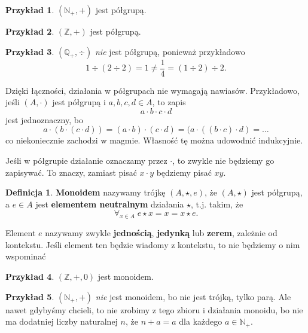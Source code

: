 \documentclass{article}
\theoremstyle{definition}
\newtheorem{definition}{Definicja}[section]
\newtheorem{example}{Przykład}[section]
\begin{document}
\begin{example}
	$(\mathbb{N}_+, +)$ jest półgrupą.
\end{example}

\begin{example}
	$(\mathbb{Z}, +)$ jest półgrupą.
\end{example}

\begin{example}
	$(\mathbb{Q}_+, \div)$ \textit{nie} jest półgrupą, ponieważ przykładowo
	\begin{equation*}
		1 \div (2 \div 2) = 1 \neq \frac{1}{4} = (1\div2)\div2.
	\end{equation*}
\end{example}

Dzięki łączności,
	działania w półgrupach nie wymagają nawiasów.
Przykładowo, jeśli $(A, \cdot)$ jest półgrupą i $a, b, c, d \in A$,
	to zapis
\begin{equation}
	a \cdot b \cdot c \cdot d
\end{equation}
	jest jednoznaczny, bo
\begin{equation}
		a \cdot (b \cdot (c \cdot d)) = 
		(a \cdot b) \cdot (c \cdot d) =
		(a \cdot ((b \cdot c) \cdot d) = \dots
\end{equation}
	co niekoniecznie zachodzi w magmie.
Własność tę można udowodnić indukcyjnie.

Jeśli w półgrupie działanie oznaczamy przez $\cdot$,
	to zwykle nie będziemy go zapisywać.
To znaczy, zamiast pisać $x \cdot y$ będziemy pisać $xy$.

\begin{definition}
	\textbf{Monoidem} nazywamy trójkę $(A, \star, e)$,
		że $(A, \star)$ jest półgrupą,
		a $e\in A$ jest \textbf{elementem neutralnym} działania $\star$,
		t.j. takim, że
	\begin{equation}
		\forall_{x \in A}\; e \star x = x = x \star e.
	\end{equation}
\end{definition}

Element $e$ nazywamy zwykle \textbf{jednością},
	\textbf{jedynką} lub \textbf{zerem},
	zależnie od kontekstu.
Jeśli element ten będzie wiadomy z kontekstu,
	to nie będziemy o nim wspominać

\begin{example}
	$(\mathbb{Z}, +, 0)$ jest monoidem.
\end{example}

\begin{example}
	$(\mathbb{N}_+, +)$ \textit{nie} jest monoidem, bo nie jest trójką, tylko parą.
	Ale nawet gdybyśmy chcieli,
		to nie zrobimy z tego zbioru i działania monoidu,
		bo nie ma dodatniej liczby naturalnej $n$,
		że $n + a = a$ dla każdego $a \in \mathbb{N}_+$.
\end{example}
\end{document}
